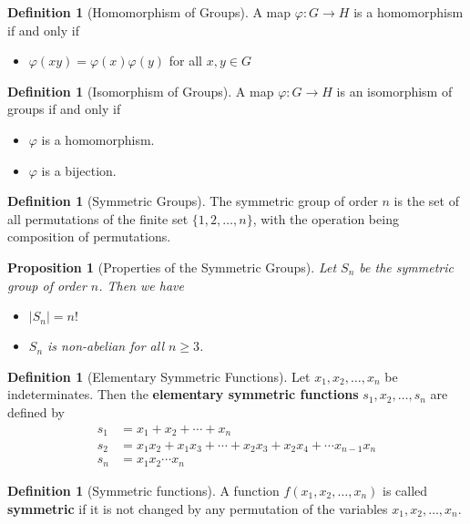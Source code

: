 \documentclass[10pt, oneside, reqno]{amsart}
\theoremstyle{plain}%
\newtheorem{prop}[thm]{Proposition}
\theoremstyle{definition}
\newtheorem{defn}[thm]{Definition}
\theoremstyle{remark}
\begin{document}
\begin{defn}[Homomorphism of Groups]
    A map $\varphi: G \rightarrow H$ is a homomorphism if and only if
    \begin{itemize}
        \item $\varphi(xy) = \varphi(x) \varphi(y)$ for all $x,y \in G$
    \end{itemize}
\end{defn}

\begin{defn}[Isomorphism of Groups]
    A map $\varphi: G \rightarrow H$ is an isomorphism of groups if and only if 
    \begin{itemize}
        \item $\varphi$ is a homomorphism.
        \item $\varphi$ is a bijection.
    \end{itemize}
\end{defn}

\begin{defn}[Symmetric Groups]
    The symmetric group of order $n$ is the set of all permutations of the finite set $\{1,2,\dots, n\}$, with the operation being composition of permutations.
\end{defn}

\begin{prop}[Properties of the Symmetric Groups]
    Let $S_n$ be the symmetric group of order $n$.  Then we have 
    \begin{itemize}
        \item  $| S_n | = n!$
        \item $S_n$ is non-abelian for all $n \geq 3$.
    \end{itemize}
    
\end{prop}

\begin{defn}[Elementary Symmetric Functions]
    Let $x_1, x_2, \dots, x_n$ be indeterminates.  Then the \textbf{elementary symmetric functions} $s_1, x_2, \dots, s_n$ are defined by \begin{align*}
        s_1 &= x_1 + x_2 + \cdots  + x_n\\
        s_2 &= x_1 x_2 + x_1 x_3 + \cdots + x_2 x_3 + x_2 x_4 + \cdots x_{n-1} x_n \\
        s_n &= x_1 x_2 \cdots x_n
    \end{align*}
\end{defn}

\begin{defn}[Symmetric functions]
A function $f(x_1, x_2, \dots, x_n)$ is called \textbf{symmetric} if it is not changed by any permutation of the variables $x_1, x_2, \dots, x_n$. 
\end{defn}
\end{document}
